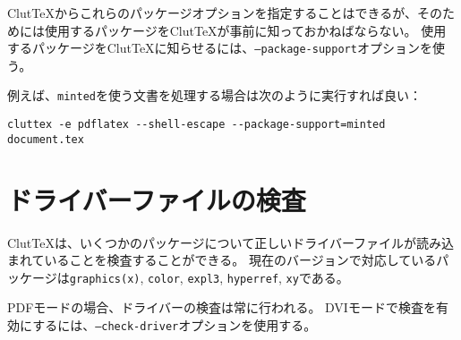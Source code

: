 \documentclass[a4paper]{ltjsreport}
\newcommand\ClutTeX{Clut\TeX}
\newcommand\texpkg[1]{\texttt{#1}}
\begin{document}
\ClutTeX{}からこれらのパッケージオプションを指定することはできるが、そのためには使用するパッケージを\ClutTeX{}が事前に知っておかねばならない。
使用するパッケージを\ClutTeX{}に知らせるには、\texttt{--package-support}オプションを使う。

例えば、\texpkg{minted}を使う文書を処理する場合は次のように実行すれば良い：
\begin{verbatim}
cluttex -e pdflatex --shell-escape --package-support=minted document.tex
\end{verbatim}

\section{ドライバーファイルの検査}

\ClutTeX{}は、いくつかのパッケージについて正しいドライバーファイルが読み込まれていることを検査することができる。
現在のバージョンで対応しているパッケージは\texpkg{graphics(x)}, \texpkg{color}, \texpkg{expl3}, \texpkg{hyperref}, \texpkg{xy}である。

PDFモードの場合、ドライバーの検査は常に行われる。
DVIモードで検査を有効にするには、\texttt{--check-driver}オプションを使用する。
\end{document}
